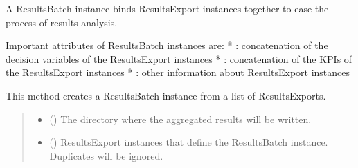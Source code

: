 \documentclass[letterpaper,10pt,english]{sphinxmanual}
\begin{document}
\begin{fulllineitems}
\begin{fulllineitems}
\begin{enumerate}
\end{enumerate}

\end{fulllineitems}


\begin{fulllineitems}
\label{\detokenize{generated/tamos.data_IO.ResultsBatch:tamos.data_IO.ResultsBatch.create_batch_from_binaries}}
\pysigstartsignatures
{}
\pysigstopsignatures
\sphinxAtStartPar
A ResultsBatch instance binds ResultsExport instances together to ease the process of results analysis.

\sphinxAtStartPar
Important attributes of ResultsBatch instances are:
* : concatenation of the decision variables of the ResultsExport instances
* : concatenation of the KPIs of the ResultsExport instances
* : other information about ResultsExport instances

\sphinxAtStartPar
This method creates a ResultsBatch instance from a list of ResultsExports.
\begin{quote}\begin{description}
\begin{itemize}
\item {} 
\sphinxAtStartPar
{} () \textendash{} The directory where the aggregated results will be written.

\item {} 
\sphinxAtStartPar
{} () \textendash{} ResultsExport instances that define the ResultsBatch instance. Duplicates will be ignored.


\end{itemize}
\end{description}
\end{quote}
\end{fulllineitems}
\end{fulllineitems}
\end{document}
